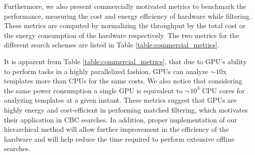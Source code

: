 Furthermore, we also present commercially motivated metrics to benchmark the performance, measuring the cost and energy efficiency of hardware while filtering. These metrics are computed by normalizing the throughput by the total cost or the energy consumption of the hardware respectively. The two metrics for the different search schemes are listed in Table \ref{table:commercial_metrics}. 
\begin{table}[ht]
    \begin{center}
    \end{center} 
    \caption{Comparing different implementations of the matched filtering schemes on GPUs (first and second row) with the established PyCBC schemes on CPUs (third and fourth row). In the second column we show the throughput for the respective methods, and in the third and fourth columns are the throughput per euro and per watt of power consumption respectively. The expected peak performance of the hierarchical method is estimated for SNR = 5.0 in the second row.}  \label{table:commercial_metrics}
\end{table}

It is apparent from Table \ref{table:commercial_metrics}, that due to GPU's ability to perform tasks in a highly parallelized fashion, GPUs can analyze $\sim 10$x templates more than CPUs for the same costs. We also notice that considering the same power consumption a single GPU is equivalent to $\sim 10^3$ CPU cores for analyzing templates at a given instant. These metrics suggest that GPUs are highly energy and cost-efficient in performing matched filtering, which motivates their application in CBC searches. In addition, proper implementation of our hierarchical method will allow further improvement in the efficiency of the hardware and will help reduce the time required to perform extensive offline searches.

